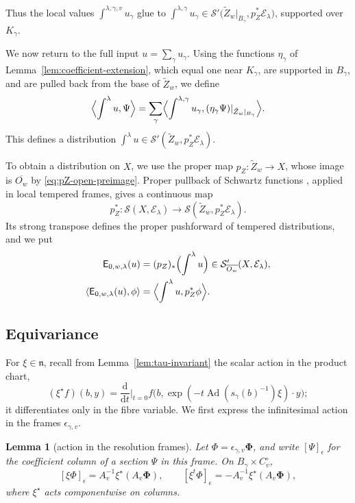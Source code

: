 \documentclass[a4paper,12pt]{amsart}
\numberwithin{equation}{section}
\newtheorem{lemma}[theorem]{Lemma}
\theoremstyle{definition}
\theoremstyle{remark}
\newcommand{\fn}{\mathfrak n}
\newcommand{\mcS}{\mathcal S}
\newcommand{\mcE}{\mathcal E}
\newcommand{\E}{\mathsf E}
\newcommand{\Ad}{\operatorname{Ad}}
\newcommand{\dd}{\mathrm d}
\begin{document}
Thus the local values $\int^{\lambda,\gamma,v}u_\gamma$ glue to
$\int^{\lambda,\gamma}u_\gamma
 \in\mcS'\bigl(\tilde Z_w|_{B_\gamma},p_Z^*\mcE_\lambda\bigr)$,
supported over $K_\gamma$.

We now return to the full input $u=\sum_\gamma u_\gamma$. Using the functions $\eta_\gamma$ of Lemma~\ref{lem:coefficient-extension}, which equal one near $K_\gamma$, are supported in $B_\gamma$, and are pulled back from the base of $\tilde Z_w$, we define
\begin{equation}\label{eq:int-lambda}
 \Bigl\langle\int^\lambda u,\Psi\Bigr\rangle=\sum_\gamma\Bigl\langle\int^{\lambda,\gamma}u_\gamma,(\eta_\gamma\Psi)|_{\tilde Z_w|_{B_\gamma}}\Bigr\rangle.
\end{equation}
This defines a distribution $\int^\lambda u\in\mcS'(\tilde Z_w,p_Z^*\mcE_\lambda)$.

To obtain a distribution on $X$, we use the proper map $p_Z:\tilde Z_w\to X$, whose image is $\overline{O_w}$ by \eqref{eq:pZ-open-preimage}. Proper pullback of Schwartz functions \cite[Theorem~1.2.4(ii)]{dC91}, applied in local tempered frames, gives a continuous map
\[
 p_Z^*:\mcS(X,\mcE_\lambda)\longrightarrow\mcS(\tilde Z_w,p_Z^*\mcE_\lambda).
\]
Its strong transpose defines the proper pushforward of tempered distributions, and we put
\begin{equation}\label{eq:E0def}
\begin{aligned}
 \E_{0,w,\lambda}(u)&=(p_Z)_*\Bigl(\int^\lambda u\Bigr)
 \in\mcS'_{\overline{O_w}}(X,\mcE_\lambda),\\
 \langle\E_{0,w,\lambda}(u),\phi\rangle
 &=\Bigl\langle\int^\lambda u,p_Z^*\phi\Bigr\rangle.
\end{aligned}
\end{equation}

\subsection{Equivariance}\label{ssec:equivariance}

For $\xi\in\fn$, recall from Lemma~\ref{lem:tau-invariant} the scalar action in the product chart,
\[
 (\xi^\star f)(b,y)=\frac{\dd}{\dd t}\Big|_{t=0}f\bigl(b,\exp(-t\Ad(s_\gamma(b)^{-1})\xi)\cdot y\bigr);
\]
it differentiates only in the fibre variable. We first express the infinitesimal action in the frames $\epsilon_{\gamma,v}$.

\begin{lemma}[action in the resolution frames]\label{lem:resolution-frame-action}
Let $\Phi=\epsilon_{\gamma,v}\boldsymbol\Phi$, and write $[\Psi]_\epsilon$ for the coefficient column of a section $\Psi$ in this frame. On $B_\gamma\times C_v^\circ$,
\[
 [\xi\Phi]_\epsilon=A_v^{-1}\xi^\star(A_v\boldsymbol\Phi),\qquad
 [\xi^t\Phi]_\epsilon=-A_v^{-1}\xi^\star(A_v\boldsymbol\Phi),
\]
where $\xi^\star$ acts componentwise on columns.
\end{lemma}
\end{document}
